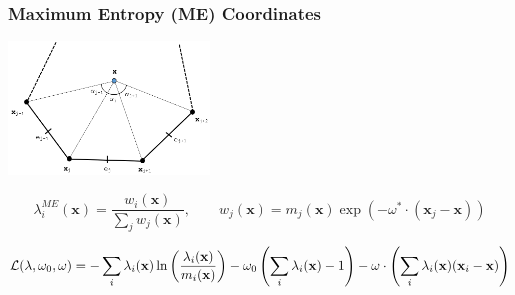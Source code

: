 \documentclass[compress,10pt]{beamer}
\renewcommand{\vec}[1]{\mathbf{#1}}
\begin{document}
\begin{frame}[t]\frametitle{Maximum Entropy (ME) Coordinates}
\centering
\includegraphics[width=0.40\textwidth]{images/ref_polygon.png}
\vspace{0.3cm}
\begin{block}{}
\begin{equation*}
\lambda_i^{ME} (\vec{x}) = \frac{w_i (\vec{x}) }{ \sum_{j} w_j (\vec{x})}, \qquad w_j (\vec{x}) = m_j(\vec{x}) \exp(- \omega^* \cdot (\vec{x}_j - \vec{x}))
\end{equation*}
\end{block}
\begin{block}{}{\small
\begin{equation*}
\mathcal{L} (\lambda, \omega_0, \omega) = - \sum\displaylimits_{i} \lambda_i (\vec{x}) \ln \left(   \frac{\lambda_i(\vec{x})}{m_i(\vec{x})} \right) - \omega_0 \left(  \sum\displaylimits_{i}  \lambda_i (\vec{x}) -1  \right) - \omega \cdot  \left(  \sum\displaylimits_{i}  \lambda_i (\vec{x}) (\vec{x}_i - \vec{x})  \right)
\end{equation*}}
\end{block}
\end{frame}
\end{document}

